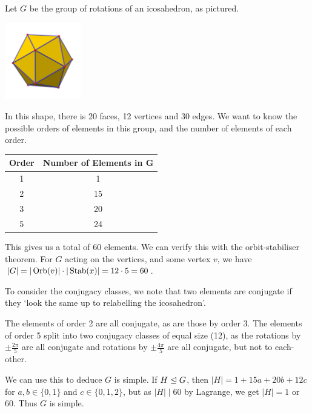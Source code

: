 \documentclass[a4paper]{scrreprt}
\begin{document}
\begin{example}
	Let $G$ be the group of rotations of an icosahedron, as pictured.
	\begin{center}
		\includegraphics[width=0.25\textwidth]{icosahedron.png}
	\end{center}

	In this shape, there is 20 faces, 12 vertices and 30 edges. We want to know the possible orders of elements in this group, and the number of elements of each order.
\begin{center}
	\begin{tabular}{@{}cc@{}}
		\toprule
		Order & Number of Elements in G   \\ \midrule
		1 	  & 1                         \\
		2	  & 15 \\
		3 	  & 20 \\
		5 	  & 24\\\bottomrule
		\end{tabular}
\end{center}
This gives us a total of $60$ elements. We can verify this with the orbit-stabiliser theorem. For $G$ acting on the vertices, and some vertex $v$, we have $|G| = |\operatorname{Orb}(v)| \cdot |\operatorname{Stab}(x)| = 12 \cdot 5 = 60$.

To consider the conjugacy classes, we note that two elements are conjugate if they `look the same up to relabelling the icosahedron'.

The elements of order 2 are all conjugate, as are those by order 3. The elements of order 5 split into two conjugacy classes of equal size (12), as the rotations by $\pm \frac{2 \pi}{5}$ are all conjugate and rotations by $\pm \frac{4 \pi}{5}$ are all conjugate, but not to each-other.

We can use this to deduce $G$ is simple. If $H \trianglelefteq G$, then $|H| = 1 + 15 a + 20b + 12c$ for $a, b \in \{0, 1\}$ and $c \in \{0, 1, 2\}$, but as $|H| \mid 60$ by Lagrange, we get $|H| = 1$ or 60. Thus $G$ is simple.


\end{example}
\end{document}
